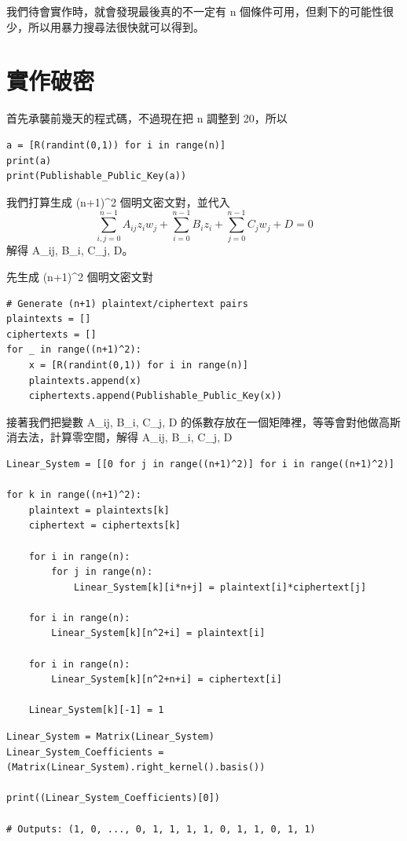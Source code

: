 \documentclass[
]{article}
\begin{document}
我們待會實作時，就會發現最後真的不一定有 n
個條件可用，但剩下的可能性很少，所以用暴力搜尋法很快就可以得到。

\hypertarget{ux5be6ux4f5cux7834ux5bc6}{%
\section{實作破密}\label{ux5be6ux4f5cux7834ux5bc6}}

首先承襲前幾天的程式碼，不過現在把 n 調整到 20，所以

\begin{verbatim}
a = [R(randint(0,1)) for i in range(n)]
print(a)
print(Publishable_Public_Key(a))
\end{verbatim}

我們打算生成 (n+1)\^{}2 個明文密文對，並代入 \[
\sum_{i,j=0}^{n-1} A_{ij}z_{i}w_{j} + 
\sum_{i=0}^{n-1} B_{i}z_{i} + 
\sum_{j=0}^{n-1} C_{j}w_{j} + D =0 
\] 解得 A\_ij, B\_i, C\_j, D。

先生成 (n+1)\^{}2 個明文密文對

\begin{verbatim}
# Generate (n+1) plaintext/ciphertext pairs
plaintexts = []
ciphertexts = []
for _ in range((n+1)^2):
    x = [R(randint(0,1)) for i in range(n)]
    plaintexts.append(x)
    ciphertexts.append(Publishable_Public_Key(x))
\end{verbatim}

接著我們把變數 A\_ij, B\_i, C\_j, D
的係數存放在一個矩陣裡，等等會對他做高斯消去法，計算零空間，解得 A\_ij,
B\_i, C\_j, D

\begin{verbatim}
Linear_System = [[0 for j in range((n+1)^2)] for i in range((n+1)^2)]

for k in range((n+1)^2):
    plaintext = plaintexts[k]
    ciphertext = ciphertexts[k]
    
    for i in range(n):
        for j in range(n):
            Linear_System[k][i*n+j] = plaintext[i]*ciphertext[j]

    for i in range(n):
        Linear_System[k][n^2+i] = plaintext[i]

    for i in range(n):
        Linear_System[k][n^2+n+i] = ciphertext[i]
    
    Linear_System[k][-1] = 1
\end{verbatim}

\begin{verbatim}
Linear_System = Matrix(Linear_System)
Linear_System_Coefficients = (Matrix(Linear_System).right_kernel().basis())

print((Linear_System_Coefficients)[0])

# Outputs: (1, 0, ..., 0, 1, 1, 1, 1, 0, 1, 1, 0, 1, 1)
\end{verbatim}
\end{document}
